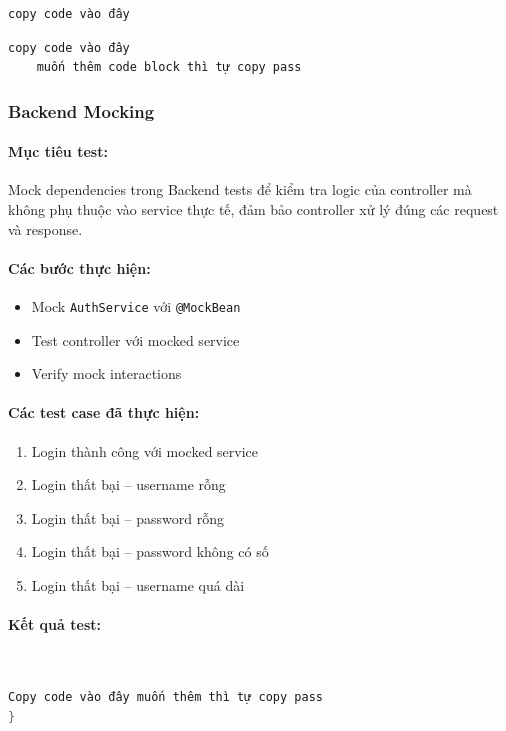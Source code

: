 \documentclass[a4paper,12pt]{article}
\begin{document}
\begin{lstlisting}[language=JavaScript, caption=Thêm mô tả]
    copy code vào đây
\end{lstlisting}
\begin{lstlisting}[language=JavaScript, caption=Viết mô tả và đây]
    copy code vào đây
    muốn thêm code block thì tự copy pass
\end{lstlisting}
\subsubsection{Backend Mocking}
\paragraph{Mục tiêu test:}
Mock dependencies trong Backend tests để kiểm tra logic của controller mà không phụ thuộc vào service thực tế, đảm bảo controller xử lý đúng các request và response.

\paragraph{Các bước thực hiện:}
\begin{itemize}
  \item Mock \texttt{AuthService} với \texttt{@MockBean}
  \item Test controller với mocked service
  \item Verify mock interactions
\end{itemize}

\paragraph{Các test case đã thực hiện:}
\begin{enumerate}[label=TC\arabic*:]
  \item Login thành công với mocked service
  \item Login thất bại -- username rỗng
  \item Login thất bại -- password rỗng
  \item Login thất bại -- password không có số
  \item Login thất bại -- username quá dài
\end{enumerate}

\paragraph{Kết quả test:}\mbox{}\\
\begin{lstlisting}[language=Java, caption=Mô tả test]
    Copy code vào đây muốn thêm thì tự copy pass
}
\end{lstlisting}
\end{document}
